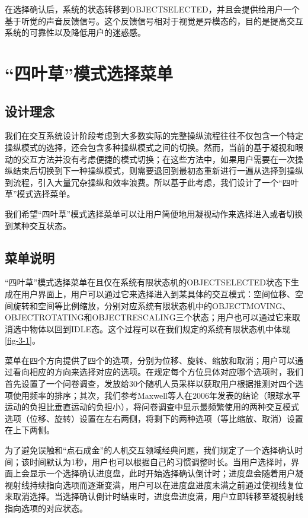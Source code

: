 在选择确认后，系统的状态转移到OBJECT\us SELECTED，并且会提供给用户一个基于听觉的声音反馈信号。这个反馈信号相对于视觉是异模态的，目的是提高交互系统的可靠性以及降低用户的迷惑感。

\section{“四叶草”模式选择菜单}\label{Clover}

\subsection{设计理念}

我们在交互系统设计阶段考虑到大多数实际的完整操纵流程往往不仅包含一个特定操纵模式的选择，还会包含多种操纵模式之间的切换。然而，当前的基于凝视和眼动的交互方法并没有考虑便捷的模式切换；在这些方法中，如果用户需要在一次操纵结束后切换到下一种操纵模式，则需要退回到最初态重新进行一遍从选择到操纵到流程，引入大量冗杂操纵和效率浪费。所以基于此考虑，我们设计了一个“四叶草”模式选择菜单。

我们希望“四叶草”模式选择菜单可以让用户简便地用凝视动作来选择进入或者切换到某种交互状态。

\subsection{菜单说明}

“四叶草”模式选择菜单在且仅在系统有限状态机的OBJECT\us SELECTED状态下生成在用户界面上，用户可以通过它来选择进入到某具体的交互模式：空间位移、空间旋转和空间等比例缩放，分别对应系统有限状态机中的OBJECT\us MOVING、OBJECT\us ROTATING和OBJECT\us RESCALING三个状态；用户也可以通过它来取消选中物体以回到IDLE态。这个过程可以在我们规定的系统有限状态机中体现\ref{fig-3-1}。

菜单在四个方向提供了四个的选项，分别为位移、旋转、缩放和取消；用户可以通过看向相应的方向来选择对应的选项。在规定每个方位具体对应哪个选项时，我们首先设置了一个问卷调查，发放给30个随机人员采样以获取用户根据推测对四个选项使用频率的排序；其次，我们参考Maxwell等人在2006年发表的结论（眼球水平运动的负担比垂直运动的负担小），将问卷调查中显示最频繁使用的两种交互模式选项（位移、旋转）设置在左右两侧，将剩下的两种选项（等比缩放、取消）设置在上下两侧。

为了避免误触和“点石成金”的人机交互领域经典问题，我们规定了一个选择确认时间；该时间默认为1秒，用户也可以根据自己的习惯调整时长。当用户选择时，界面上会显示一个选择确认进度盘，此时开始选择确认倒计时；进度盘会随着用户凝视射线持续指向选项而逐渐变满，用户可以在进度盘进度未满之前通过使视线复位来取消选择。当选择确认倒计时结束时，进度盘进度满，用户立即转移至凝视射线指向选项的对应状态。


